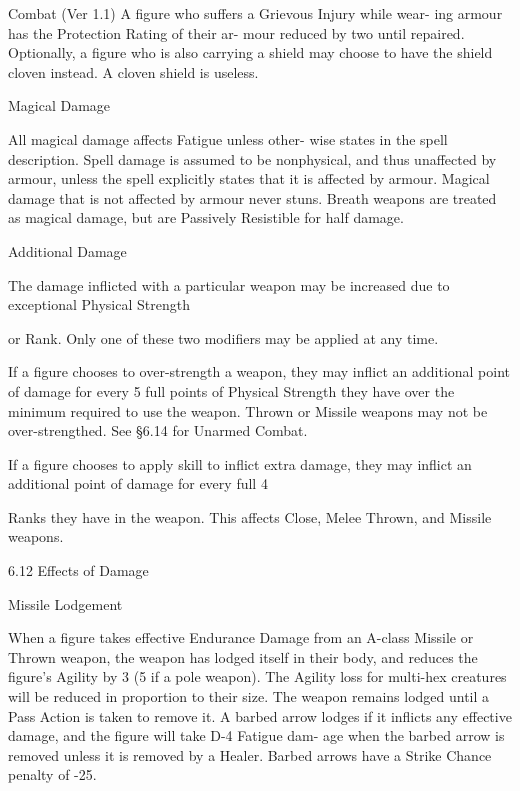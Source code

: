 \begin{Chapter}{Combat (Ver 1.1)}
A figure who suffers a Grievous Injury while wear-
ing  armour  has  the  Protection  Rating  of  their  ar-
mour  reduced  by  two  until  repaired.  Optionally,  a 
figure who is also carrying a shield may choose to 
have  the  shield  cloven  instead.  A  cloven  shield  is 
useless. 

Magical Damage 

All  magical  damage  affects  Fatigue  unless  other-
wise states in the spell description. Spell damage is 
assumed to be nonphysical, and thus unaffected by 
armour,  unless  the  spell  explicitly  states  that  it  is 
affected  by  armour.  Magical  damage  that  is  not 
affected  by  armour  never  stuns.  Breath  weapons 
are  treated  as  magical  damage,  but  are  Passively 
Resistible for half damage. 

Additional Damage 

The damage inflicted with a particular weapon may 
be  increased  due  to  exceptional  Physical  Strength 

or  Rank.  Only  one  of  these  two  modifiers  may  be 
applied at any time. 

If a figure chooses to over-strength a weapon, they 
may inflict an additional point of damage for every 
5  full  points  of  Physical  Strength  they  have  over 
the  minimum required to use  the  weapon.  Thrown 
or  Missile  weapons  may  not  be  over-strengthed. 
See §6.14 for Unarmed Combat. 

If  a  figure  chooses  to  apply  skill  to  inflict  extra 
damage,  they  may  inflict  an  additional  point  of 
damage for every full 4 

Ranks they have in the weapon. This affects Close, 
Melee Thrown, and Missile weapons. 

6.12 Effects of Damage 

Missile Lodgement 

When  a  figure  takes  effective  Endurance  Damage 
from  an  A-class  Missile  or  Thrown  weapon,  the 
weapon has lodged itself in their body, and reduces 
the figure’s Agility by 3 (5 if a pole weapon). The 
Agility loss for multi-hex creatures will be reduced 
in  proportion  to  their  size.  The  weapon  remains 
lodged until a Pass Action is taken to remove it. A 
barbed  arrow  lodges  if  it  inflicts  any  effective 
damage, and the figure will take D-4 Fatigue dam-
age  when the barbed arrow is  removed unless it is 
removed by a Healer. Barbed arrows have a Strike 
Chance penalty of -25. 


\end{Chapter}
